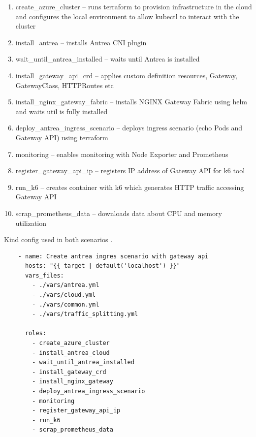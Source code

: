 \begin{enumerate}
  \item create\_azure\_cluster -- runs terraform to provision infrastructure in the cloud and configures the local environment to allow kubectl to interact with the cluster
  \item install\_antrea -- installs Antrea CNI plugin
  \item wait\_until\_antrea\_installed -- waits until Antrea is installed
  \item install\_gateway\_api\_crd -- applies custom definition resources, Gateway, GatewayClass, HTTPRoutes etc
  \item install\_nginx\_gateway\_fabric -- installs NGINX Gateway Fabric using helm and waits util is fully installed
  \item deploy\_antrea\_ingress\_scenario -- deploys ingress scenario (echo Pods and Gateway API) using terraform
  \item monitoring -- enables monitoring with Node Exporter and Prometheus
  \item register\_gateway\_api\_ip -- registers IP address of Gateway API for k6 tool
  \item run\_k6 -- creates container with k6 which generates HTTP traffic accessing Gateway API
  \item scrap\_prometheus\_data -- downloads data about CPU and memory utilization
\end{enumerate}

\begin{listing}[H]
  \centering
  \caption{Kind config used in both scenarios \cite{KindConfig}.}
  \begin{verbatim}
    - name: Create antrea ingres scenario with gateway api
      hosts: "{{ target | default('localhost') }}"
      vars_files:
        - ./vars/antrea.yml
        - ./vars/cloud.yml
        - ./vars/common.yml
        - ./vars/traffic_splitting.yml

      roles:
        - create_azure_cluster
        - install_antrea_cloud
        - wait_until_antrea_installed
        - install_gateway_crd
        - install_nginx_gateway
        - deploy_antrea_ingress_scenario
        - monitoring
        - register_gateway_api_ip
        - run_k6
        - scrap_prometheus_data
  \end{verbatim}
  \label{lst:antreaIngressPlaybook}
\end{listing}


